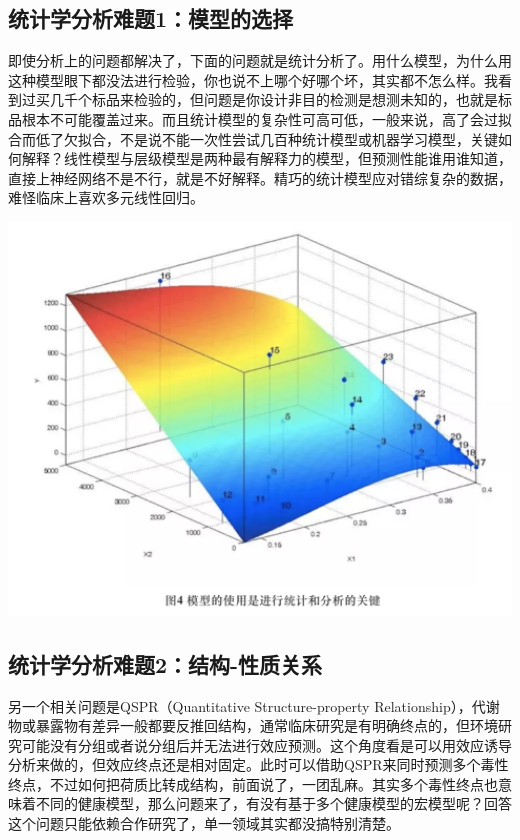 \documentclass[]{book}
\begin{document}
\hypertarget{ux7edfux8ba1ux5b66ux5206ux6790ux96beux98981ux6a21ux578bux7684ux9009ux62e9}{%
\subsection{统计学分析难题1：模型的选择}\label{ux7edfux8ba1ux5b66ux5206ux6790ux96beux98981ux6a21ux578bux7684ux9009ux62e9}}

即使分析上的问题都解决了，下面的问题就是统计分析了。用什么模型，为什么用这种模型眼下都没法进行检验，你也说不上哪个好哪个坏，其实都不怎么样。我看到过买几千个标品来检验的，但问题是你设计非目的检测是想测未知的，也就是标品根本不可能覆盖过来。而且统计模型的复杂性可高可低，一般来说，高了会过拟合而低了欠拟合，不是说不能一次性尝试几百种统计模型或机器学习模型，关键如何解释？线性模型与层级模型是两种最有解释力的模型，但预测性能谁用谁知道，直接上神经网络不是不行，就是不好解释。精巧的统计模型应对错综复杂的数据，难怪临床上喜欢多元线性回归。

\includegraphics[width=6.67in]{images/expo4}

\hypertarget{ux7edfux8ba1ux5b66ux5206ux6790ux96beux98982ux7ed3ux6784-ux6027ux8d28ux5173ux7cfb}{%
\subsection{统计学分析难题2：结构-性质关系}\label{ux7edfux8ba1ux5b66ux5206ux6790ux96beux98982ux7ed3ux6784-ux6027ux8d28ux5173ux7cfb}}

另一个相关问题是QSPR（Quantitative Structure-property Relationship），代谢物或暴露物有差异一般都要反推回结构，通常临床研究是有明确终点的，但环境研究可能没有分组或者说分组后并无法进行效应预测。这个角度看是可以用效应诱导分析来做的，但效应终点还是相对固定。此时可以借助QSPR来同时预测多个毒性终点，不过如何把荷质比转成结构，前面说了，一团乱麻。其实多个毒性终点也意味着不同的健康模型，那么问题来了，有没有基于多个健康模型的宏模型呢？回答这个问题只能依赖合作研究了，单一领域其实都没搞特别清楚。
\end{document}
